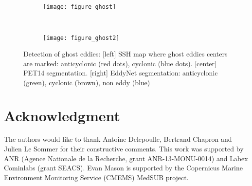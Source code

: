 \documentclass[journal]{IEEEtran}
\begin{document}
\begin{figure}
    \centering
    \begin{subfigure}[b]{0.5\textwidth}
       \texttt{[image: figure\_ghost]}
       \caption{}\label{fig:ghost1}
    \end{subfigure}
    ~ 
    \begin{subfigure}[b]{0.5\textwidth}
       \texttt{[image: figure\_ghost2]}
       \caption{}\label{fig:ghost2}
    \end{subfigure}
\caption{Detection of ghost eddies: [left] SSH map where ghost eddies centers are marked: anticyclonic (red dots), cyclonic (blue dots). [center] PET14 segmentation. [right] EddyNet segmentation: anticyclonic (green), cyclonic (brown), non eddy (blue)}
\label{fig:ghost}
\end{figure}


\section*{Acknowledgment}


The authors would like to thank Antoine Delepoulle, Bertrand Chapron and Julien Le Sommer for their constructive comments. This  work  was  supported  by  ANR (Agence Nationale de la Recherche, grant ANR-13-MONU-0014) and Labex Cominlabs (grant  SEACS). Evan Mason is supported by the Copernicus Marine Environment Monitoring Service (CMEMS) MedSUB project.


\ifCLASSOPTIONcaptionsoff
  \newpage
\fi







%
\end{document}
